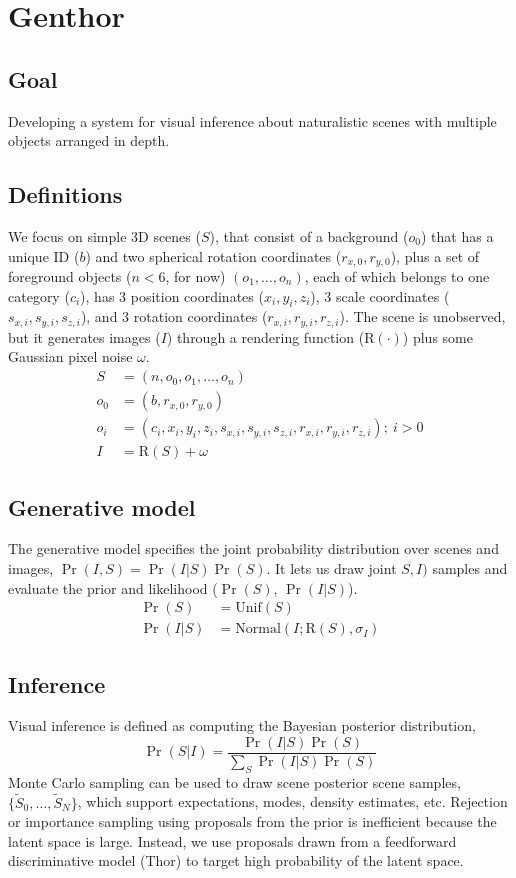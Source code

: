 \documentclass[]{report}
\begin{document}
\section*{Genthor}
\subsection*{Goal}
Developing a system for visual inference about naturalistic scenes
with multiple objects arranged in depth.

\subsection*{Definitions}
We focus on simple 3D scenes ($S$), that consist of a background
($o_0$) that has a unique ID ($b$) and two spherical rotation
coordinates ($r_{x,0}, r_{y,0}$), plus a set of foreground objects ($n
< 6$, for now) $(o_1,\dots,o_n)$, each of which belongs to one
category ($c_i$), has 3 position coordinates ($x_i,y_i,z_i$), 3 scale
coordinates ($s_{x,i},s_{y,i},s_{z,i}$), and 3 rotation coordinates
($r_{x,i},r_{y,i},r_{z,i}$). The scene is unobserved, but it generates
images ($I$) through a rendering function ($\mathrm{R}(\cdot)$) plus
some Gaussian pixel noise $\omega$.
\begin{align*}
  S &= (n,o_0,o_1,\dots,o_n)\\
  o_0 &= (b, r_{x,0}, r_{y,0})\\
  o_i &= (c_i, x_i,y_i,z_i, s_{x,i},s_{y,i},s_{z,i}, r_{x,i},r_{y,i},r_{z,i});\ i > 0\\
  I &= \mathrm{R}(S) + \omega
\end{align*}

\subsection*{Generative model}
The generative model specifies the joint probability distribution over
scenes and images, $\Pr(I,S) = \Pr(I | S)\Pr(S)$. It lets us draw
joint $S,I)$ samples and evaluate the prior and likelihood ($\Pr(S)$,
$\Pr(I|S)$). 
\begin{align*}
  \Pr(S) &= \mathrm{Unif}(S)\\
  \Pr(I | S) &= \mathrm{Normal}(I; \mathrm{R}(S), \sigma_I)
\end{align*}

\subsection*{Inference}
Visual inference is defined as computing the Bayesian posterior
distribution,
\[
\Pr(S | I) = \frac{\Pr(I | S)\Pr(S)}{\sum_S \Pr(I | S)\Pr(S)}
\]
Monte Carlo sampling can be used to draw scene posterior scene
samples, $\{\tilde{S}_0,\dots,\tilde{S}_N\}$, which support
expectations, modes, density estimates, etc. Rejection or importance
sampling using proposals from the prior is inefficient because the
latent space is large. Instead, we use proposals drawn from a
feedforward discriminative model (Thor) to target high probability of
the latent space.
\end{document}
